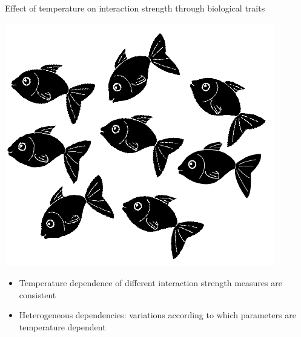 \documentclass[11pt, compress, aspectratio=1610]{beamer}
\providecommand{\tightlist}{%
  \setlength{\itemsep}{0pt}\setlength{\parskip}{0pt}}
\newcommand{\stopcols}{\end{columns}}
\begin{document}

\begin{frame}{Effect of temperature on interaction strength through
biological traits}

\centering
\includegraphics[width=0.3\linewidth]{figuresAz/fish_pop.pdf} \par

\begin{itemize}
\tightlist
\item
  Temperature dependence of different interaction strength measures are
  consistent
\item
  Heterogeneous dependencies: variations according to which parameters
  are temperature dependent
\end{itemize}

\end{frame}
\end{document}

